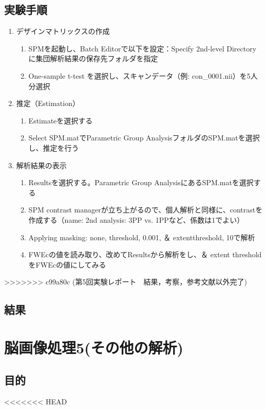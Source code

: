 \documentclass{jlreq}
\begin{document}
\subsection{実験手順}
\begin{enumerate}
    \item デザインマトリックスの作成
        \begin{enumerate}
            \item SPMを起動し、Batch Editorで以下を設定：Specify 2nd-level Directory に集団解析結果の保存先フォルダを指定
            \item One-sample t-test を選択し、スキャンデータ（例: con\_0001.nii）を5人分選択
        \end{enumerate}
    \item 推定（Estimation）
        \begin{enumerate}
            \item Estimateを選択する
            \item Select SPM.matでParametric Group AnalysisフォルダのSPM.matを選択し、推定を行う
        \end{enumerate}
    \item 解析結果の表示
        \begin{enumerate}
            \item Resultsを選択する。Parametric Group AnalysisにあるSPM.matを選択する
            \item SPM contrast managerが立ち上がるので、個人解析と同様に、contrastを作成する（name: 2nd
                analysis: 3PP vs. 1PPなど、係数は1でよい）
            \item Applying masking: none, threshold, 0.001, ＆ extentthreshold, 10で解析
            \item FWEcの値を読み取り、改めてResultsから解析をし、＆ extent thresholdをFWEcの値にしてみる
        \end{enumerate}
\end{enumerate}
>>>>>>> c99a80c (第5回実験レポート　結果，考察，参考文献以外完了)
\subsection{結果}

\section{脳画像処理5(その他の解析)}
\subsection{目的}
<<<<<<< HEAD
\end{document}
